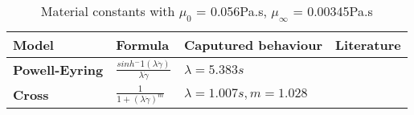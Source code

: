 \documentclass[11pt,letterpaper]{article}
\begin{document}
\renewcommand*{\arraystretch}{1.8}
\begin{table}[htbp]
\centering
\begin{tabular}{p{2.5cm}p{6cm}p{6cm}p{1.5cm}}
\toprule
Model & Formula & Caputured behaviour & Literature \\
\midrule
\textbf{Powell-Eyring} & $\frac{sinh{^-1}(\lambda\Dot{\gamma})}{\lambda\Dot{\gamma}}$ & $\lambda=5.383s$\\
\textbf{Cross}  & $\frac{1}{1+(\lambda\Dot{\gamma})^m}$ & $\lambda=1.007s, m = 1.028$\\
\bottomrule
\end{tabular}
\caption[Tabelle]{Material constants with $\mu_0$ = 0.056Pa.s, $\mu_{\infty}$ = 0.00345Pa.s}
\label{tab:toll1}
\end{table}




\newpage
\end{document}
